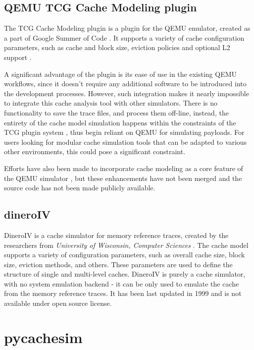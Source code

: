\subsection{QEMU TCG Cache Modeling plugin} \label{sec:qemu_cache}

The TCG Cache Modeling plugin is a plugin for the QEMU emulator, created as a part of Google Summer of Code \cite{qemucachegsoc}. It supports a variety of cache configuration parameters, such as
cache and block size, eviction policies and optional L2 support \cite{tcgcachemodelling}.

A significant advantage of the plugin is its ease of use in the existing QEMU workflows, since it doesn't require any additional software to be introduced into the development processes.
However, such integration makes it nearly impossible to integrate this cache analysis tool with other simulators. There is no functionality to save the trace files, and process them off-line,
instead, the entirety of the cache model simulation happens within the constraints of the TCG plugin system \cite{qemutcgplugindocs}, thus begin reliant on QEMU for simulating 
payloads. For users looking for modular cache simulation tools that can be adapted to various other environments, this could pose a significant constraint.

\vspace{10px}
\noindent Efforts have also been made to incorporate cache modeling as a core feature of the QEMU simulator \cite{qemucacheattempt}, but these enhancements have not been merged and the
source code has not been made publicly available.

\subsection{dineroIV}

DineroIV is a cache simulator for memory reference traces, created by the researchers from \textit{University of Wisconsin, Computer Sciences} \cite{dinero}. 
The cache model supports a variety of configuration parameters, such as overall cache size, block size, eviction methods, and others. These parameters are used to define the structure of
single and multi-level caches. DineroIV is purely a cache simulator, with no system emulation backend - it can be only used to emulate the cache from the memory reference traces.
It has been last updated in 1999 and is not available under open source license.

\section{pycachesim}

